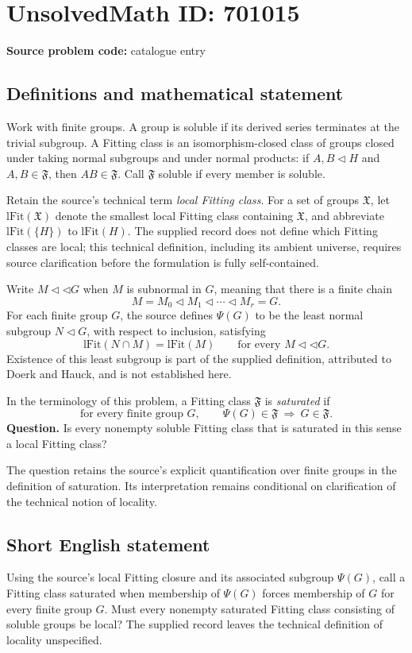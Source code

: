 \documentclass[11pt]{article}
\begin{document}
\section*{UnsolvedMath ID: 701015}
\textbf{Source problem code:} catalogue entry
\subsection{Definitions and mathematical statement}
Work with finite groups. A group is soluble if its derived series terminates at the trivial subgroup. A Fitting class is an isomorphism-closed class of groups closed under taking normal subgroups and under normal products: if \(A,B\lhd H\) and \(A,B\in\mathfrak F\), then \(AB\in\mathfrak F\). Call \(\mathfrak F\) soluble if every member is soluble.

Retain the source's technical term \emph{local Fitting class}. For a set of groups \(\mathfrak X\), let \(\mathrm{lFit}(\mathfrak X)\) denote the smallest local Fitting class containing \(\mathfrak X\), and abbreviate \(\mathrm{lFit}(\{H\})\) to \(\mathrm{lFit}(H)\). The supplied record does not define which Fitting classes are local; this technical definition, including its ambient universe, requires source clarification before the formulation is fully self-contained.

Write \(M\lhd\lhd G\) when \(M\) is subnormal in \(G\), meaning that there is a finite chain
\[
M=M_0\lhd M_1\lhd\cdots\lhd M_r=G.
\]
For each finite group \(G\), the source defines \(\Psi(G)\) to be the least normal subgroup \(N\lhd G\), with respect to inclusion, satisfying
\[
\mathrm{lFit}(N\cap M)=\mathrm{lFit}(M)
\qquad\text{for every }M\lhd\lhd G.
\]
Existence of this least subgroup is part of the supplied definition, attributed to Doerk and Hauck, and is not established here.

In the terminology of this problem, a Fitting class \(\mathfrak F\) is \emph{saturated} if
\[
\text{for every finite group }G,\qquad
\Psi(G)\in\mathfrak F\ \Longrightarrow\ G\in\mathfrak F.
\]
\textbf{Question.} Is every nonempty soluble Fitting class that is saturated in this sense a local Fitting class?

The question retains the source's explicit quantification over finite groups in the definition of saturation. Its interpretation remains conditional on clarification of the technical notion of locality.
\subsection{Short English statement}
Using the source's local Fitting closure and its associated subgroup \(\Psi(G)\), call a Fitting class saturated when membership of \(\Psi(G)\) forces membership of \(G\) for every finite group \(G\). Must every nonempty saturated Fitting class consisting of soluble groups be local? The supplied record leaves the technical definition of locality unspecified.
\end{document}
